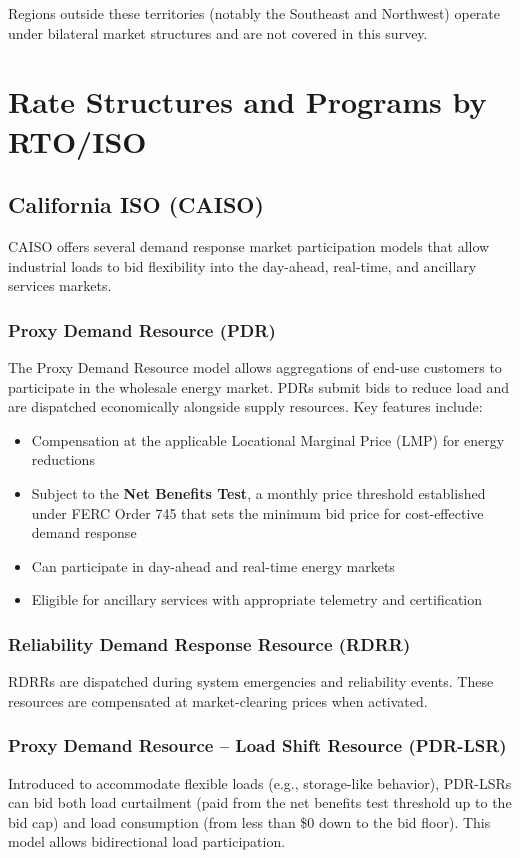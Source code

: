 \documentclass[12pt]{article}
\begin{document}
\noindent Regions outside these territories (notably the Southeast and Northwest) operate under bilateral market structures and are not covered in this survey.

\section{Rate Structures and Programs by RTO/ISO}

\subsection{California ISO (CAISO)}

CAISO offers several demand response market participation models that allow industrial loads to bid flexibility into the day-ahead, real-time, and ancillary services markets.

\subsubsection{Proxy Demand Resource (PDR)}
The Proxy Demand Resource model allows aggregations of end-use customers to participate in the wholesale energy market. PDRs submit bids to reduce load and are dispatched economically alongside supply resources. Key features include:
\begin{itemize}
    \item Compensation at the applicable Locational Marginal Price (LMP) for energy reductions
    \item Subject to the \textbf{Net Benefits Test}, a monthly price threshold established under FERC Order 745 that sets the minimum bid price for cost-effective demand response
    \item Can participate in day-ahead and real-time energy markets
    \item Eligible for ancillary services with appropriate telemetry and certification
\end{itemize}

\subsubsection{Reliability Demand Response Resource (RDRR)}
RDRRs are dispatched during system emergencies and reliability events. These resources are compensated at market-clearing prices when activated.

\subsubsection{Proxy Demand Resource -- Load Shift Resource (PDR-LSR)}
Introduced to accommodate flexible loads (e.g., storage-like behavior), PDR-LSRs can bid both load curtailment (paid from the net benefits test threshold up to the bid cap) and load consumption (from less than \$0 down to the bid floor). This model allows bidirectional load participation.
\end{document}
